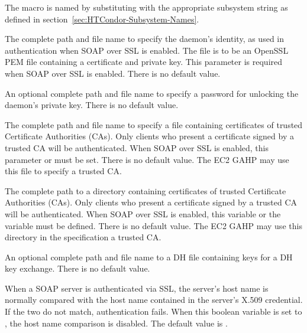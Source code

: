 \begin{description}
  The macro is named by substituting 
  with the appropriate subsystem string as defined in
  section~\ref{sec:HTCondor-Subsystem-Names}.

\label{param:SoapSSLServerKeyfile}
\item[\Macro{SOAP\_SSL\_SERVER\_KEYFILE}]
  The complete path and file name to specify the daemon's
  identity, as used in authentication when SOAP over SSL is enabled.
  The file is to be  an OpenSSL PEM file containing a certificate
  and private key.
  This parameter is required when SOAP over SSL is enabled.
  There is no default value.

\label{param:SoapSSLServerKeyfilePassword}
\item[\Macro{SOAP\_SSL\_SERVER\_KEYFILE\_PASSWORD}]
  An optional complete path and file name to specify
  a password for unlocking the daemon's private key.
  There is no default value.

\label{param:SoapSSLCaFile}
\item[\Macro{SOAP\_SSL\_CA\_FILE}]
  The complete path and file name to specify 
  a file containing certificates of trusted Certificate Authorities (CAs).
  Only clients who present a certificate signed by a trusted
  CA will be authenticated.
  When SOAP over SSL is enabled, this parameter or
   must be set.
  There is no default value.
  The EC2 GAHP may use this file to specify a trusted CA.

\label{param:SoapSSLCaDir}
\item[\Macro{SOAP\_SSL\_CA\_DIR}]
  The complete path to a directory
  containing certificates of trusted Certificate Authorities (CAs).
  Only clients who present a certificate signed by a trusted
  CA will be authenticated.
  When SOAP over SSL is enabled, this variable or the variable
   must be defined.
  There is no default value.
  The EC2 GAHP may use this directory in the specification a trusted CA.

\label{param:SoapSSLDhFile}
\item[\Macro{SOAP\_SSL\_DH\_FILE}]
  An optional complete path and file name to a DH file
  containing keys for a DH key exchange.
  There is no default value.

\label{param:SoapSslSkipHostCheck}
\item[\Macro{SOAP\_SSL\_SKIP\_HOST\_CHECK}]
  When a SOAP server is authenticated via SSL, the server's host name
  is normally compared with the host name contained in the server's
  X.509 credential. If the two do not match, authentication fails.
  When this boolean variable is set to ,
  the host name comparison is disabled.
  The default value is .

\end{description}



